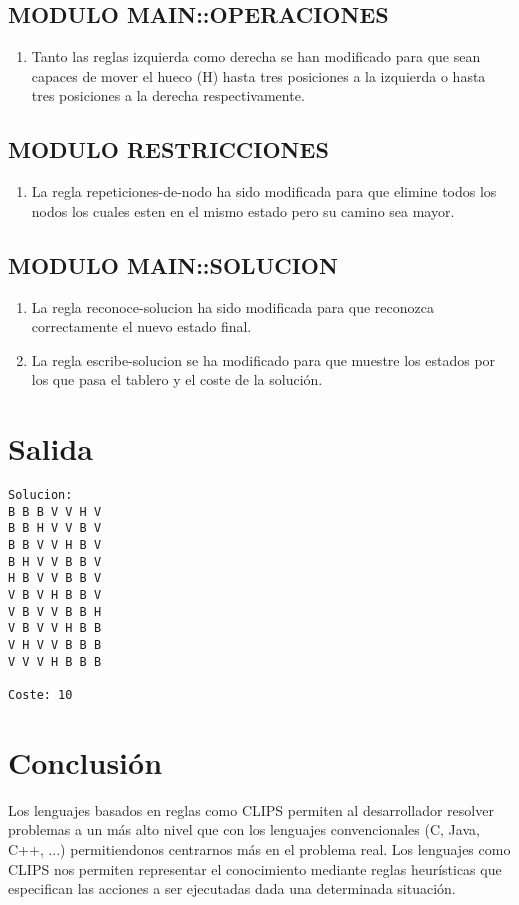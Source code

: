 \documentclass[a4paper]{article}
\begin{document}
\subsection{MODULO MAIN::OPERACIONES}
\begin{enumerate}
\item Tanto las reglas izquierda como derecha se han modificado para que sean capaces de mover el hueco (H) hasta tres posiciones a la izquierda o hasta tres posiciones a la derecha respectivamente.
\end{enumerate}
\subsection{MODULO RESTRICCIONES}
\begin{enumerate}
\item La regla repeticiones-de-nodo ha sido modificada para que elimine todos los nodos los cuales esten en el mismo estado pero su camino sea mayor.
\end{enumerate}
\subsection{MODULO MAIN::SOLUCION}
\begin{enumerate}
\item La regla reconoce-solucion ha sido modificada para que reconozca correctamente el nuevo estado final.
\item La regla escribe-solucion se ha modificado para que muestre los estados por los que pasa el tablero y el coste de la solución.
\end{enumerate}
\section{Salida}
\begin{lstlisting}
Solucion:
B B B V V H V
B B H V V B V
B B V V H B V
B H V V B B V
H B V V B B V
V B V H B B V
V B V V B B H
V B V V H B B
V H V V B B B
V V V H B B B

Coste: 10
\end{lstlisting}

\section{Conclusión}
Los lenguajes basados en reglas como CLIPS permiten al desarrollador resolver problemas a un más alto nivel que con los lenguajes convencionales (C, Java, C++, ...) permitiendonos centrarnos más en el problema real. Los lenguajes como CLIPS nos permiten representar el conocimiento mediante reglas heurísticas que especifican las acciones a ser ejecutadas dada una determinada situación.
\end{document}
